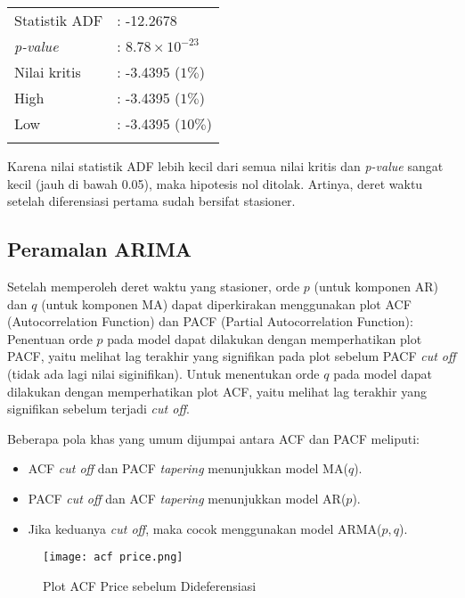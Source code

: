 \documentclass[a4paper,12pt]{article}
\begin{document}
\begin{tabular}{l l}
    \centering
    Statistik ADF & : -12.2678 \\
    \textit{p-value} & : $8.78 \times 10^{-23}$ \\
    Nilai kritis & : -3.4395 ($1\%$)\\
    High & : -3.4395 ($1\%$) \\
    Low & : -3.4395 ($10\%$) \\
    &
\end{tabular}

Karena nilai statistik ADF lebih kecil dari semua nilai kritis dan \textit{p-value} sangat kecil (jauh di bawah 0.05), maka hipotesis nol ditolak. Artinya, deret waktu setelah diferensiasi pertama sudah bersifat stasioner. 

\subsection{Peramalan ARIMA}

Setelah memperoleh deret waktu yang stasioner, orde $p$ (untuk komponen AR) dan $q$ (untuk komponen MA) dapat diperkirakan menggunakan plot ACF (Autocorrelation Function) dan PACF (Partial Autocorrelation Function): \\

Penentuan orde $p$ pada model dapat dilakukan dengan memperhatikan plot PACF, yaitu melihat lag terakhir yang signifikan pada plot sebelum PACF \textit{cut off} (tidak ada lagi nilai siginifikan). Untuk menentukan orde $q$ pada model dapat dilakukan dengan memperhatikan plot ACF, yaitu melihat lag terakhir yang signifikan sebelum terjadi \textit{cut off}.

Beberapa pola khas yang umum dijumpai antara ACF dan PACF meliputi:
\begin{itemize}[label={\tiny\raisebox{1ex}{\textbullet}}]
    \item ACF \textit{cut off} dan PACF \textit{tapering} menunjukkan model MA($q$).
    \item PACF \textit{cut off} dan ACF \textit{tapering} menunjukkan model AR($p$).
    \item Jika keduanya \textit{cut off}, maka cocok menggunakan model ARMA($p,q$).
\end{itemize}

\begin{figure}[H]
    \centering
    \texttt{[image: acf price.png]}
    \caption{Plot ACF Price sebelum Dideferensiasi}
    \label{fig:acf non diff}
\end{figure}
\end{document}
